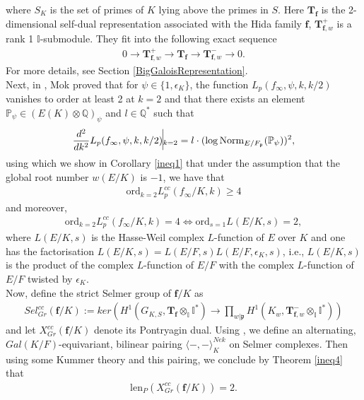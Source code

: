 \documentclass[reqno,10pt]{amsart}
\newcommand{\q}{\mathbb{Q}}
\newcommand{\I}{\mathbb{I}}
\newcommand{\f}{\mathbf{f}}
\newcommand{\T}{\mathbf{T}}
\newcommand{\p}{\mathfrak{p}}
\theoremstyle{plain}
\theoremstyle{definition}
\begin{document}
where $S_K$ is the set of primes of $K$ lying above the primes in $S$.
Here $\T_\f$ is the 2-dimensional self-dual representation associated with the Hida family $\f$, $\T_{\f,w}^+$ is a rank 1 $\I$-submodule. They fit into the following exact sequence
\begin{align*}
    0 \rightarrow \T_{\f,w}^+ \rightarrow \T_\f \rightarrow \T_{\f,w}^- \rightarrow 0.
\end{align*}
For more details, see Section \ref{BigGaloisRepresentation}.
\\
Next, in \cite{MokHeegnerPoints}, Mok proved that for $\psi \in \{1, \epsilon_K\}$, the function $L_p(f_\infty,\psi,k,k/2)$ vanishes to order at least 2 at $k = 2$ and that there exists an element $\mathbb{P}_\psi \in (E(K) \otimes \q)_\psi$ and $l \in \q^*$ such that
\begin{align*}
    \frac{d^2}{dk^2} L_p(f_\infty,\psi,k,k/2) \vline_{k=2} = l \cdot (\log\mathrm{Norm}_{E/F_\p}(\mathbb{P}_\psi))^2,
\end{align*}
using which we show in Corollary \ref{ineq1} that under the assumption that the global root number $w(E/K)$ is $-1$, we have that 
\begin{align} \label{introineq2}
    \mathrm{ord}_{k=2} L_p^{cc}(f_\infty/K,k) \geq 4
\end{align}
and moreover,
\begin{align} \label{introineq3}
    \mathrm{ord}_{k=2} L_p^{cc}(f_\infty/K,k) = 4 \iff \mathrm{ord}_{s=1}L(E/K,s) = 2,
\end{align}
where $L(E/K,s) $ is the Hasse-Weil complex $L$-function of $E$ over $K$ and one has the factorisation  $L(E/K,s)=L(E/F,s)L(E/F,\epsilon_K,s)$, i.e., $L(E/K,s)$ is  the product of the complex $L$-function of $E/F$ with the complex $L$-function of $E/F$ twisted by $\epsilon_K$.
\\
Now, define the strict Selmer group of $\f/K$ as
\begin{align*}
    Sel^{cc}_{Gr}(\f/K) := ker \left(H^1(G_{K,S},\T_\f \otimes_\I \I^*) \rightarrow \prod_{w|\mathfrak{p}} H^1(K_w,\T_{\f,w}^- \otimes_\I \I^*) \right)
\end{align*}
and let $X^{cc}_{Gr}(\f/K)$ denote its Pontryagin dual. Using \cite{Nekovar}, we define an alternating, $Gal(K/F)$-equivariant, bilinear pairing $\langle -,- \rangle^{Nek}_K$ on Selmer complexes. Then using some Kummer theory and this pairing, we conclude by Theorem \ref{ineq4} that 
\begin{align} \label{introineq4}
    \mathrm{len}_P(X^{cc}_{Gr}(\f/K)) = 2.
\end{align}
\end{document}
